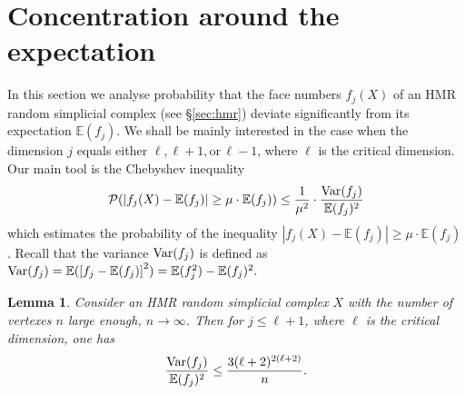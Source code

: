 \documentclass[11pt,twoside, reqno]{amsart}
\theoremstyle{plain}
\newtheorem{lema}{Lemma}
\theoremstyle{definition}
\newcommand{\E}{\mathbb{E}}
\begin{document}
\section{Concentration around the expectation}

In this section we analyse probability that the face numbers $f_j(X)$ of an HMR random simplicial complex 
(see \S \ref{sec:hmr})
deviate significantly from its expectation $\E(f_j)$. We shall be mainly interested in the case when the dimension $j$ equals either $\ell, \ell+1, \mbox{or}\, \ell-1$, where $\ell$ is the critical dimension. 
Our main tool is the Chebyshev inequality 
\begin{eqnarray}\label{in:32f}
\mathcal P(|f_j(X) - \mathbb E(f_j)|\ge \mu \cdot \mathbb E(f_j)) \le \frac{1}{\mu^2}\cdot \frac{{\rm {Var}}(f_j)}{\mathbb E(f_j)^2}
\end{eqnarray}
which estimates the probability of the inequality $|f_j(X) - \mathbb E(f_j)|\ge \mu \cdot \mathbb E(f_j)$. Recall that the variance  
${\rm {Var}}(f_j)$ is defined as 
${\rm {Var}}(f_j)=\E(\left [f_j-\E(f_j)\right ]^2)=\E(f_j^2)-\E(f_j)^2.$

\begin{lema}\label{lm:26}
Consider an HMR random simplicial complex $X$ with the number of vertexes $n$ large enough, $n\to \infty$. Then for $j\le \ell+1$, where $\ell$ is the critical dimension, one has 
$$
\frac{{{\rm {Var}}(f_j)}}{\E(f_j)^2}\le \frac{3 (\ell+2)^{2(\ell+2)}}{n}.
$$
\end{lema}
\end{document}
